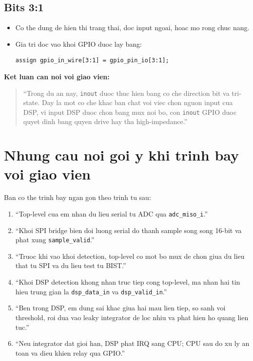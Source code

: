\documentclass[12pt,a4paper]{article}
\begin{document}
\subsection{Bits 3:1}
\begin{itemize}
    \item Co the dung de hien thi trang thai, doc input ngoai, hoac mo rong chuc nang.
    \item Gia tri doc vao khoi GPIO duoc lay bang:
\begin{lstlisting}[style=svstyle]
assign gpio_in_wire[3:1] = gpio_pin_io[3:1];
\end{lstlisting}
\end{itemize}

\textbf{Ket luan can noi voi giao vien:}
\begin{quote}
``Trong du an nay, \texttt{inout} duoc thuc hien bang co che direction bit va tri-state. Day la mot co che khac ban chat voi viec chon nguon input cua DSP, vi input DSP duoc chon bang mux noi bo, con \texttt{inout} GPIO duoc quyet dinh bang quyen drive hay tha high-impedance.''
\end{quote}

\section{Nhung cau noi goi y khi trinh bay voi giao vien}
Ban co the trinh bay ngan gon theo trinh tu sau:

\begin{tcolorbox}[colback=blue!3,colframe=blue!40!black,title=Goi y cach noi]
\begin{enumerate}[label=\arabic*.]
    \item ``Top-level cua em nhan du lieu serial tu ADC qua \texttt{adc\_miso\_i}.''
    \item ``Khoi SPI bridge bien doi luong serial do thanh sample song song 16-bit va phat xung \texttt{sample\_valid}.''
    \item ``Truoc khi vao khoi detection, top-level co mot bo mux de chon giua du lieu that tu SPI va du lieu test tu BIST.''
    \item ``Khoi DSP detection khong nhan truc tiep cong top-level, ma nhan hai tin hieu trung gian la \texttt{dsp\_data\_in} va \texttt{dsp\_valid\_in}.''
    \item ``Ben trong DSP, em dung sai khac giua hai mau lien tiep, so sanh voi threshold, roi dua vao leaky integrator de loc nhiu va phat hien ho quang lien tuc.''
    \item ``Neu integrator dat gioi han, DSP phat IRQ sang CPU; CPU sau do xu ly an toan va dieu khien relay qua GPIO.''
\end{enumerate}
\end{tcolorbox}
\end{document}
